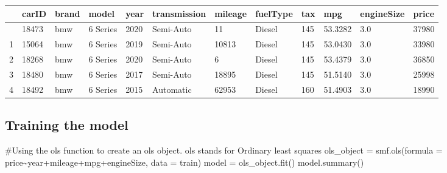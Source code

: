\documentclass[
  letterpaper,
  DIV=11,
  numbers=noendperiod]{scrreprt}
\newenvironment{Shaded}{\begin{snugshade}}{\end{snugshade}}
\newcommand{\CommentTok}[1]{\textcolor[rgb]{0.37,0.37,0.37}{#1}}
\newcommand{\NormalTok}[1]{\textcolor[rgb]{0.00,0.23,0.31}{#1}}
\newcommand{\OperatorTok}[1]{\textcolor[rgb]{0.37,0.37,0.37}{#1}}
\newcommand{\StringTok}[1]{\textcolor[rgb]{0.13,0.47,0.30}{#1}}
\begin{document}
\begin{longtable}[]{@{}llllllllllll@{}}
\toprule\noalign{}
& carID & brand & model & year & transmission & mileage & fuelType & tax
& mpg & engineSize & price \\
\midrule\noalign{}
\endhead
\bottomrule\noalign{}
\endlastfoot
0 & 18473 & bmw & 6 Series & 2020 & Semi-Auto & 11 & Diesel & 145 &
53.3282 & 3.0 & 37980 \\
1 & 15064 & bmw & 6 Series & 2019 & Semi-Auto & 10813 & Diesel & 145 &
53.0430 & 3.0 & 33980 \\
2 & 18268 & bmw & 6 Series & 2020 & Semi-Auto & 6 & Diesel & 145 &
53.4379 & 3.0 & 36850 \\
3 & 18480 & bmw & 6 Series & 2017 & Semi-Auto & 18895 & Diesel & 145 &
51.5140 & 3.0 & 25998 \\
4 & 18492 & bmw & 6 Series & 2015 & Automatic & 62953 & Diesel & 160 &
51.4903 & 3.0 & 18990 \\
\end{longtable}

\subsection{Training the model}\label{training-the-model}

\begin{Shaded}
\begin{Highlighting}[]
\CommentTok{\#Using the ols function to create an ols object. \textquotesingle{}ols\textquotesingle{} stands for \textquotesingle{}Ordinary least squares\textquotesingle{}}
\NormalTok{ols\_object }\OperatorTok{=}\NormalTok{ smf.ols(formula }\OperatorTok{=} \StringTok{\textquotesingle{}price\textasciitilde{}year+mileage+mpg+engineSize\textquotesingle{}}\NormalTok{, data }\OperatorTok{=}\NormalTok{ train)}
\NormalTok{model }\OperatorTok{=}\NormalTok{ ols\_object.fit()}
\NormalTok{model.summary()}
\end{Highlighting}
\end{Shaded}
\end{document}
